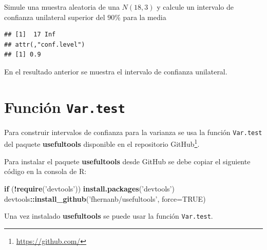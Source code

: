 \documentclass[10pt,]{krantz}
\makeatletter
\newenvironment{Shaded}{\begin{snugshade}}{\end{snugshade}}
\newcommand{\KeywordTok}[1]{\textcolor[rgb]{0.13,0.29,0.53}{\textbf{#1}}}
\newcommand{\DataTypeTok}[1]{\textcolor[rgb]{0.13,0.29,0.53}{#1}}
\newcommand{\DecValTok}[1]{\textcolor[rgb]{0.00,0.00,0.81}{#1}}
\newcommand{\FloatTok}[1]{\textcolor[rgb]{0.00,0.00,0.81}{#1}}
\newcommand{\StringTok}[1]{\textcolor[rgb]{0.31,0.60,0.02}{#1}}
\newcommand{\OtherTok}[1]{\textcolor[rgb]{0.56,0.35,0.01}{#1}}
\newcommand{\ControlFlowTok}[1]{\textcolor[rgb]{0.13,0.29,0.53}{\textbf{#1}}}
\newcommand{\OperatorTok}[1]{\textcolor[rgb]{0.81,0.36,0.00}{\textbf{#1}}}
\newcommand{\NormalTok}[1]{#1}
\let\proglang=\textsf
\renewcommand{\href}[2]{#2\footnote{\url{#1}}}
\newenvironment{kframe}{%
\medskip{}
\setlength{\fboxsep}{.8em}
 \def\at@end@of@kframe{}%
 \ifinner\ifhmode%
  \def\at@end@of@kframe{\end{minipage}}%
  \begin{minipage}{\columnwidth}%
 \fi\fi%
 \def\FrameCommand##1{\hskip\@totalleftmargin \hskip-\fboxsep
 \colorbox{shadecolor}{##1}\hskip-\fboxsep
     \hskip-\linewidth \hskip-\@totalleftmargin \hskip\columnwidth}%
 \MakeFramed {\advance\hsize-\width
   \@totalleftmargin\z@ \linewidth\hsize
   \@setminipage}}%
 {\par\unskip\endMakeFramed%
 \at@end@of@kframe}
\renewenvironment{Shaded}{\begin{kframe}}{\end{kframe}}
\makeatother
\begin{document}
Simule una muestra aleatoria de una \(N(18, 3)\) y calcule un intervalo
de confianza unilateral superior del \(90\%\) para la media

\begin{Shaded}
\end{Shaded}

\begin{verbatim}
## [1]  17 Inf
## attr(,"conf.level")
## [1] 0.9
\end{verbatim}

En el resultado anterior se muestra el intervalo de confianza
unilateral.

\section{\texorpdfstring{Función
\texttt{Var.test}}{Función Var.test}}\label{funcion-var.test}

Para construir intervalos de confianza para la varianza se usa la
función \texttt{Var.test} del paquete \textbf{usefultools}
\citep{R-usefultools} disponible en el repositorio
\href{https://github.com/}{GitHub}.

Para instalar el paquete \textbf{usefultools} desde GitHub se debe
copiar el siguiente código en la consola de \proglang{R}:

\begin{Shaded}
\begin{Highlighting}[]
\ControlFlowTok{if}\NormalTok{ (}\OperatorTok{!}\KeywordTok{require}\NormalTok{(}\StringTok{'devtools'}\NormalTok{)) }\KeywordTok{install.packages}\NormalTok{(}\StringTok{'devtools'}\NormalTok{)}
\NormalTok{devtools}\OperatorTok{::}\KeywordTok{install_github}\NormalTok{(}\StringTok{'fhernanb/usefultools'}\NormalTok{, }\DataTypeTok{force=}\OtherTok{TRUE}\NormalTok{)}
\end{Highlighting}
\end{Shaded}

Una vez instalado \textbf{usefultools} se puede usar la función
\texttt{Var.test}.
\end{document}
